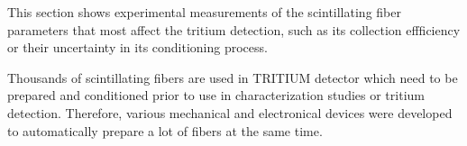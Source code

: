 This section shows experimental measurements of the scintillating fiber parameters that most affect the tritium detection, such as its collection effficiency or their uncertainty in its conditioning process.

Thousands of scintillating fibers are used in TRITIUM detector which need to be prepared and conditioned prior to use in characterization studies or tritium detection. Therefore, various mechanical and electronical devices were developed to automatically prepare a lot of fibers at the same time.